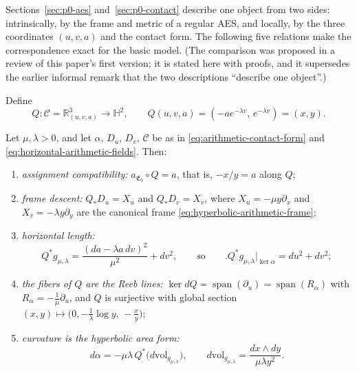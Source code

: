 Sections~\ref{sec:p0-aes} and~\ref{sec:p0-contact} describe one object from two
sides: intrinsically, by the frame and metric of a regular AES, and locally, by
the three coordinates $(u,v,a)$ and the contact form.  The following five
relations make the correspondence exact for the basic model.  (The comparison
was proposed in a review of this paper's first version; it is stated here with
proofs, and it supersedes the earlier informal remark that the two descriptions
``describe one object''.)

Define
\begin{equation}\label{eq:p0-contact-quotient-map}
  Q:\mathcal C=\mathbb R^3_{(u,v,a)}\longrightarrow\mathbb H^2,
  \qquad
  Q(u,v,a)=(-ae^{-\lambda v},\,e^{-\lambda v})=(x,y).
\end{equation}

\begin{proposition}
\label{prop:p0-contact-quotient}
Let $\mu,\lambda>0$, and let $\alpha$, $D_u$, $D_v$, $\mathcal C$ be as in
\eqref{eq:arithmetic-contact-form} and \eqref{eq:horizontal-arithmetic-fields}.
Then:
\begin{enumerate}
  \item \emph{assignment compatibility:} $a_{\mathfrak E_0}\circ Q=a$, that is,
  $-x/y=a$ along $Q$;
  \item \emph{frame descent:} $Q_*D_u=X_u$ and $Q_*D_v=X_v$, where
  $X_u=-\mu y\partial_x$ and $X_v=-\lambda y\partial_y$ are the canonical frame
  \eqref{eq:hyperbolic-arithmetic-frame};
  \item \emph{horizontal length:}
  \[
    Q^*g_{\mu,\lambda}
    =\frac{(da-\lambda a\,dv)^2}{\mu^2}+dv^2,
    \qquad\text{so}\qquad
    \bigl.Q^*g_{\mu,\lambda}\bigr|_{\ker\alpha}=du^2+dv^2 ;
  \]
  \item \emph{the fibers of $Q$ are the Reeb lines:}
  $\ker dQ=\operatorname{span}(\partial_u)
  =\operatorname{span}(R_\alpha)$ with $R_\alpha=-\tfrac1\mu\partial_u$, and
  $Q$ is surjective with global section
  $(x,y)\mapsto\bigl(0,-\tfrac1\lambda\log y,\,-\tfrac xy\bigr)$;
  \item \emph{curvature is the hyperbolic area form:}
  \[
    d\alpha=-\mu\lambda\,Q^*\bigl(d\mathrm{vol}_{g_{\mu,\lambda}}\bigr),
    \qquad
    d\mathrm{vol}_{g_{\mu,\lambda}}=\frac{dx\wedge dy}{\mu\lambda y^2}.
  \]
\end{enumerate}
\end{proposition}

